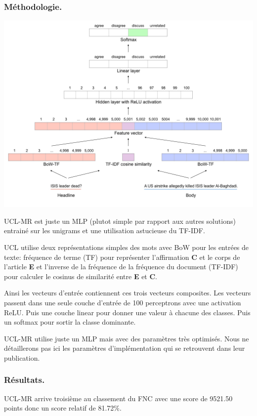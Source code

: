 \documentclass[11pt,a4paper,oldfontcommands]{memoir}
\begin{document}
\subsubsection{Méthodologie.}
\begin{center}
 \includegraphics[scale=0.35]{../../img/model/uclmr/uclmr_model.png}
 \label{fig4}
\end{center}
UCL-MR est juste un MLP (plutot simple par rapport aux autres solutions) entrainé sur les unigrams et une utilisation astucieuse du TF-IDF.

UCL utilise deux représentations simples des mots avec BoW pour les entrées de texte: fréquence de terme (TF) pour représenter l'affirmation \textbf{C} et le corps de l'article \textbf{E} et l'inverse de la fréquence de la fréquence du document (TF-IDF) pour calculer le cosinus de similarité entre \textbf{E} et \textbf{C}.

Ainsi les vecteurs d'entrée contiennent ces trois vecteurs composites.
Les vecteurs passent dans une seule couche d'entrée de 100 perceptrons avec une activation ReLU.
Puis une couche linear pour donner une valeur à chacune des classes.
Puis un softmax pour sortir la classe dominante.

UCL-MR utilise juste un MLP mais avec des paramètres très optimisés.
Nous ne détaillerons pas ici les paramètres d'implémentation qui se retrouvent dans leur publication.
\subsubsection{Résultats.}
UCL-MR arrive troisième au classement du FNC avec une score de 9521.50 points donc un score relatif de 81.72\%.
\end{document}
